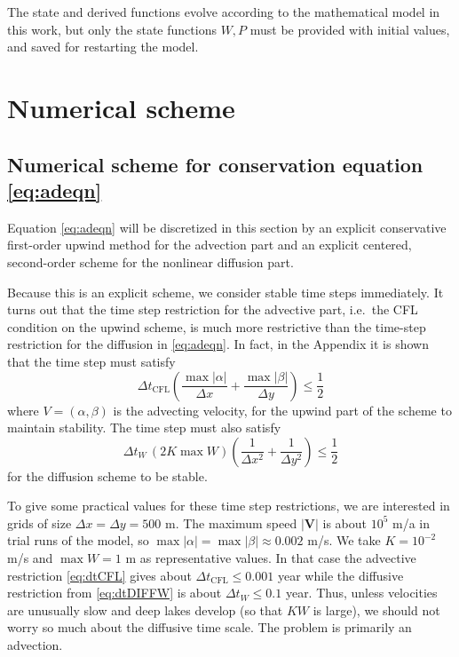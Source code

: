 \documentclass[12pt,final]{amsart}%
\newcommand\bV{\mathbf{V}}
\begin{document}
The state and derived functions evolve according to the mathematical model in this work, but only the state functions $W,P$ must be provided with initial values, and saved for restarting the model.



\section{Numerical scheme}

\subsection*{Numerical scheme for conservation equation \eqref{eq:adeqn}}  Equation \eqref{eq:adeqn} will be discretized in this section by an explicit conservative first-order upwind method for the advection part and an explicit centered, second-order scheme for the nonlinear diffusion part.

Because this is an explicit scheme, we consider stable time steps immediately.  It turns out that the time step restriction for the advective part, i.e.~the CFL condition on the upwind scheme, is much more restrictive than the time-step restriction for the diffusion in \eqref{eq:adeqn}.  In fact, in the Appendix it is shown that the time step must satisfy
\begin{equation}
\Delta t_{\text{CFL}} \left(\frac{\max |\alpha|}{\Delta x} + \frac{\max |\beta|}{\Delta y}\right) \le \frac{1}{2} \label{eq:dtCFL}
\end{equation}
where $V=(\alpha,\beta)$ is the advecting velocity, for the upwind part of the scheme to maintain stability.  The time step must also satisfy
\begin{equation}
\Delta t_W\, (2 K \max W) \left(\frac{1}{\Delta x^2} + \frac{1}{\Delta y^2}\right) \le \frac{1}{2} \label{eq:dtDIFFW}
\end{equation}
for the diffusion scheme to be stable.

To give some practical values for these time step restrictions, we are interested in grids of size $\Delta x = \Delta y = 500$ m.  The maximum speed $|\bV|$ is about $10^5$ m/a in trial runs of the model, so $\max |\alpha| = \max |\beta| \approx 0.002$ m/s.  We take $K=10^{-2}$ m/s and $\max W=1$ m as representative values.  In that case the advective restriction \eqref{eq:dtCFL} gives about $\Delta t_{\text{CFL}} \le 0.001$ year while the diffusive restriction from \eqref{eq:dtDIFFW} is about $\Delta t_W \le 0.1$ year.  Thus, unless velocities are unusually slow and deep lakes develop (so that $KW$ is large), we should not worry so much about the diffusive time scale.  The problem is primarily an advection.
\end{document}
